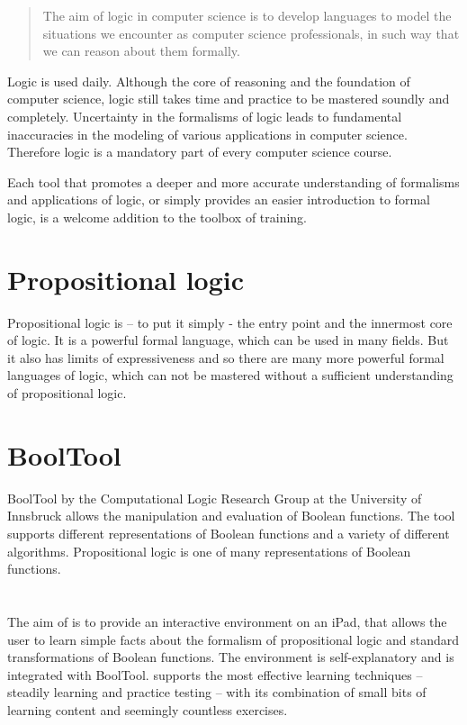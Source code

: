 
\begin{quote}
The aim of logic in computer science is to develop languages 
to model the situations we encounter as computer science professionals, 
in such way that we can reason about them formally. \cite{Huth:2004:LCS:975331}
\end{quote}

Logic is used daily. Although the core of reasoning and the foundation of computer science, 
logic still takes time and practice to be mastered soundly and completely. 
Uncertainty in the formalisms of logic leads to fundamental inaccuracies 
in the modeling of various applications in computer science. 
Therefore logic is a mandatory part of every computer science course. 

Each tool that promotes a deeper and more accurate understanding of formalisms and applications of logic,
or simply provides an easier introduction to formal logic, 
is a welcome addition to the toolbox of training.


\section{Propositional logic}

Propositional logic is – to put it simply - the entry point and the innermost core of logic. 
It is a powerful formal language, which can be used in many fields. 
But it also has limits of expressiveness and so 
there are many more powerful formal languages of logic, 
which can not be mastered without a sufficient understanding  of propositional logic.

\section{BoolTool}

BoolTool by the Computational Logic Research Group at the University of Innsbruck allows the manipulation and evaluation of Boolean functions. The tool supports different representations of Boolean functions and a variety of different algorithms.
Propositional logic is one of many representations of Boolean functions.

\section{\Nyaya}

The aim of \Nyaya is to provide an interactive environment on an iPad,
that allows the user to learn simple facts about the formalism of propositional logic 
and standard transformations of Boolean functions. 
The environment is self-explanatory and is integrated with BoolTool. 
\Nyaya supports the most effective learning techniques – 
steadily learning and practice testing \cite{Dunlosky01012013} –
with its combination 
of small bits of learning content and seemingly countless exercises. 


%
